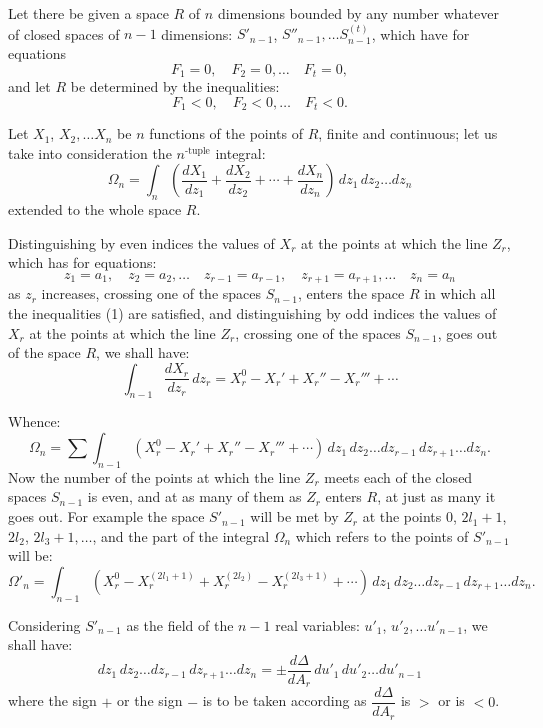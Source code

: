 \documentclass{article}
\begin{document}
Let there be given a space $R$ of $n$ dimensions bounded by any number whatever of closed spaces of $n-1$ dimensions: $S'_{n-1}$, $S''_{n-1},\ldots S^{(t)}_{n-1}$, which have for equations
\[ F_{1} = 0, \quad F_{2} = 0,\ldots \quad F_{t} = 0, \]
and let $R$ be determined by the inequalities:
\[ F_{1} < 0, \quad F_{2} < 0,\ldots \quad F_{t} < 0. \tag{1} \]

Let $X_{1}$, $X_{2},\ldots X_{n}$ be $n$ functions of the points of $R$, finite and continuous; let us take into consideration the $n^{\text{-tuple}}$ integral:
\[ \Omega_{n} = \int_{n} \left( \frac{dX_{1}}{dz_{1}} + \frac{dX_{2}}{dz_{2}} + \cdots + \frac{dX_{n}}{dz_{n}} \right)\,dz_{1}\,dz_{2}\ldots dz_{n} \]
extended to the whole space $R$.

Distinguishing by even indices the values of $X_{r}$ at the points at which the line $Z_{r}$, which has for equations:
\[ z_{1} = a_{1}, \quad z_{2} = a_{2},\ldots \quad z_{r-1} = a_{r-1}, \quad z_{r+1} = a_{r+1},\ldots \quad z_{n} = a_{n} \tag{2} \]
as $z_{r}$ increases, crossing one of the spaces $S_{n-1}$, enters the space $R$ in which all the inequalities (1) are satisfied, and distinguishing by odd indices the values of $X_{r}$ at the points at which the line $Z_{r}$, crossing one of the spaces $S_{n-1}$, goes out of the space $R$, we shall have:
\[ \int_{n-1} \frac{dX_{r}}{dz_{r}}\,dz_{r} = X_{r}^{0} - X_{r}' + X_{r}'' - X_{r}''' + \cdots \]

Whence:
\[ \Omega_{n} = \sum \int_{n-1} (X_{r}^{0} - X_{r}' + X_{r}'' - X_{r}''' + \cdots)\,dz_{1}\,dz_{2}\ldots dz_{r-1}\,dz_{r+1}\ldots dz_{n}. \]
Now the number of the points at which the line $Z_{r}$ meets each of the closed spaces $S_{n-1}$ is even, and at as many of them as $Z_{r}$ enters $R$, at just as many it goes out. For example the space $S'_{n-1}$ will be met by $Z_{r}$ at the points 0, $2l_{1}+1$, $2l_{2}$, $2l_{3}+1,\ldots$, and the part of the integral $\Omega_{n}$ which refers to the points of $S'_{n-1}$ will be:
\[ \Omega'_{n} = \int_{n-1} (X_{r}^{0} - X_{r}^{(2l_{1}+1)} + X_{r}^{(2l_{2})} - X_{r}^{(2l_{3}+1)} + \cdots)\,dz_{1}\,dz_{2}\ldots dz_{r-1}\,dz_{r+1}\ldots dz_{n}. \]

Considering $S'_{n-1}$ as the field of the $n-1$ real variables: $u'_{1}$, $u'_{2},\ldots u'_{n-1}$, we shall have:
\[ dz_{1}\,dz_{2}\ldots dz_{r-1}\,dz_{r+1}\ldots dz_{n} = \pm \frac{d\Delta}{dA_{r}}\,du'_{1}\,du'_{2}\ldots du'_{n-1} \]
where the sign $+$ or the sign $-$ is to be taken according as $\dfrac{d\Delta}{dA_{r}}$ is $>$ or is $< 0$.
\end{document}
